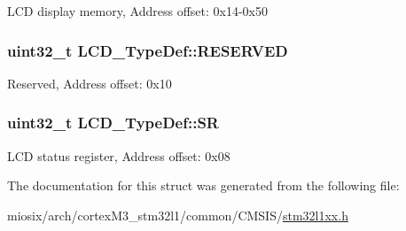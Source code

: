 L\-C\-D display memory, Address offset\-: 0x14-\/0x50 \hypertarget{struct_l_c_d___type_def_a556dfa8484476079c2ab593766754d02}{
\subsubsection[{R\-E\-S\-E\-R\-V\-E\-D}]{\setlength{\rightskip}{0pt plus 5cm}uint32\-\_\-t L\-C\-D\-\_\-\-Type\-Def\-::\-R\-E\-S\-E\-R\-V\-E\-D}}\label{struct_l_c_d___type_def_a556dfa8484476079c2ab593766754d02}
Reserved, Address offset\-: 0x10 \hypertarget{struct_l_c_d___type_def_ad54495b57709dac1909e1f90d147606b}{
\subsubsection[{S\-R}]{ uint32\-\_\-t L\-C\-D\-\_\-\-Type\-Def\-::\-S\-R}}\label{struct_l_c_d___type_def_ad54495b57709dac1909e1f90d147606b}
L\-C\-D status register, Address offset\-: 0x08 

The documentation for this struct was generated from the following file\-:\begin{DoxyCompactItemize}
\item 
miosix/arch/cortex\-M3\-\_\-stm32l1/common/\-C\-M\-S\-I\-S/\hyperlink{stm32l1xx_8h}{stm32l1xx.\-h}\end{DoxyCompactItemize}
